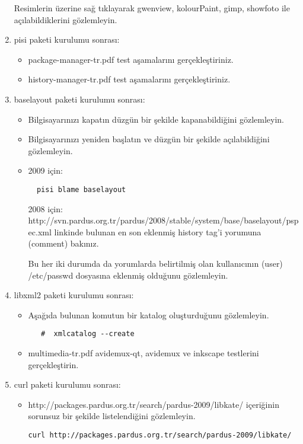 \documentclass[a4paper,10pt]{article}
\begin{document}
\begin{enumerate}
Resimlerin üzerine sağ tıklayarak gwenview, kolourPaint, gimp, showfoto ile açılabildiklerini gözlemleyin.

\item pisi paketi kurulumu sonrası:
\begin{itemize}
 \item package-manager-tr.pdf test aşamalarını gerçekleştiriniz.
 \item history-manager-tr.pdf test aşamalarını gerçekleştiriniz.
\end{itemize}

\item baselayout paketi kurulumu sonrası:
\begin{itemize}
 \item Bilgisayarınızı kapatın düzgün bir şekilde kapanabildiğini gözlemleyin.
 \item Bilgisayarınızı yeniden başlatın ve düzgün bir şekilde açılabildiğini gözlemleyin.
 \item 2009 için:
  \begin{verbatim}
  pisi blame baselayout
  \end{verbatim}
      2008 için: http://svn.pardus.org.tr/pardus/2008/stable/system/base/baselayout/pspec.xml linkinde bulunan en son eklenmiş history tag'i yorumuna (comment) bakınız.

   Bu her iki durumda da yorumlarda belirtilmiş olan kullanıcının (user) /etc/passwd dosyasına eklenmiş olduğunu gözlemleyin.

\end{itemize}
\item libxml2 paketi kurulumu sonrası:

\begin{itemize}
\item Aşağıda bulunan komutun bir katalog oluşturduğunu gözlemleyin.
  \begin{verbatim}
   #  xmlcatalog --create
  \end{verbatim}
\item multimedia-tr.pdf avidemux-qt, avidemux ve inkscape testlerini gerçekleştirin.
\end{itemize}
\item curl paketi kurulumu sonrası:

\begin{itemize}
\item http://packages.pardus.org.tr/search/pardus-2009/libkate/ içeriğinin sorunsuz bir şekilde listelendiğini gözlemleyin.
\begin{verbatim}
curl http://packages.pardus.org.tr/search/pardus-2009/libkate/
\end{verbatim}


\end{itemize}
\end{enumerate}
\end{document}
